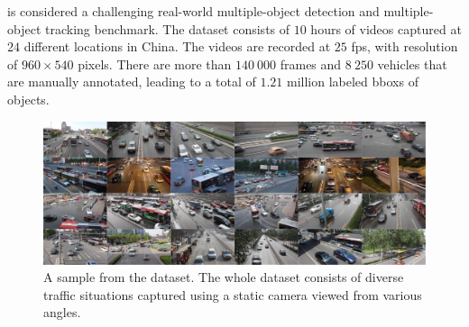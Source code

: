 \uadetrac{} is considered a challenging real-world multiple-object detection and multiple-object tracking benchmark. The dataset consists of $10$ hours of videos captured at $24$ different locations in China. The videos are recorded at $25$ \gls{fps}, with resolution of $960 \times 540$ pixels. There are more than $140\ 000$ frames and $8\ 250$ vehicles that are manually annotated, leading to a total of $1.21$ million labeled \glspl{bbox} of objects.

\begin{figure}[t]
    \centerline{\includegraphics[width=\linewidth]{figures/datasets/uadetrac_samples.jpg}}
    \caption[\uadetrac{} dataset]{A sample from the \uadetrac{} dataset. The whole dataset consists of diverse traffic situations captured using a static camera viewed from various angles. }
    \label{fig:DatasetUADETRAC}
\end{figure}

\def\uadetracfigsize{0.4}

